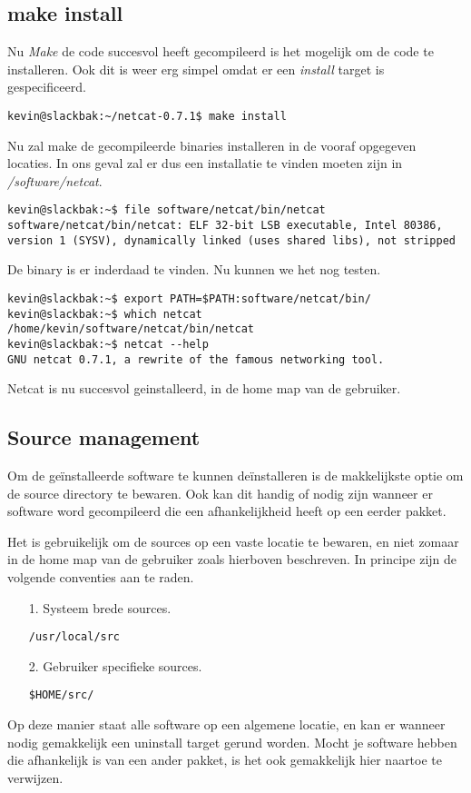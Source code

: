 \subsection{make install}
Nu \emph{Make} de code succesvol heeft gecompileerd is het mogelijk om de code te installeren. Ook dit is weer erg simpel omdat er een \emph{install} target is gespecificeerd. 
\begin{lstlisting}
kevin@slackbak:~/netcat-0.7.1$ make install
\end{lstlisting}%
Nu zal make de gecompileerde binaries installeren in de vooraf opgegeven locaties. In ons geval zal er dus een installatie te vinden moeten zijn in \emph{\customtilde/software/netcat}. 
\begin{lstlisting}
kevin@slackbak:~$ file software/netcat/bin/netcat 
software/netcat/bin/netcat: ELF 32-bit LSB executable, Intel 80386, version 1 (SYSV), dynamically linked (uses shared libs), not stripped
\end{lstlisting}%
De binary is er inderdaad te vinden. Nu kunnen we het nog testen. 
\begin{lstlisting}
kevin@slackbak:~$ export PATH=$PATH:software/netcat/bin/
kevin@slackbak:~$ which netcat 
/home/kevin/software/netcat/bin/netcat
kevin@slackbak:~$ netcat --help
GNU netcat 0.7.1, a rewrite of the famous networking tool.
\end{lstlisting}
Netcat is nu succesvol geinstalleerd, in de home map van de gebruiker. 

\subsection{Source management}
Om de ge\"{i}nstalleerde software te kunnen de\"{i}nstalleren is de makkelijkste optie om de source directory te bewaren. Ook kan dit handig of nodig zijn wanneer er software word gecompileerd die een afhankelijkheid heeft op een eerder pakket. 

Het is gebruikelijk om de sources op een vaste locatie te bewaren, en niet zomaar in de home map van de gebruiker zoals hierboven beschreven. In principe zijn de volgende conventies aan te raden. 
\begin{itemize}
\item[1.] Systeem brede sources.
\begin{lstlisting}
/usr/local/src
\end{lstlisting}
\item[2.] Gebruiker specifieke sources.
\begin{lstlisting}
$HOME/src/
\end{lstlisting}%
\end{itemize}
Op deze manier staat alle software op een algemene locatie, en kan er wanneer nodig gemakkelijk een uninstall target gerund worden. Mocht je software hebben die afhankelijk is van een ander pakket, is het ook gemakkelijk hier naartoe te verwijzen. 
